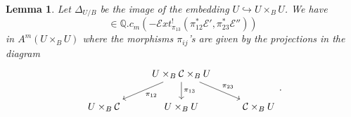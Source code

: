 \documentclass[11pt]{amsart}
\newtheorem{lemma}[theorem]{Lemma}
\theoremstyle{definition}
\newcommand{\Q}{\mathbb{Q}}
\newcommand{\hr}{\hookrightarrow}
\begin{document}
\begin{lemma}\label{lem2.1}
    Let $\Delta_{U/B}$ be the image of the embedding $U\hr U\times_B U$. We have \begin{equation*}[\Delta_{U/B}] \in \Q. c_{m} \left (-\mathscr Ext^!_{\pi_{13}} \left (\pi_{12}^* \mathcal E', \pi_{23}^*\mathcal E''  \right ) \right )\end{equation*} in $A^m \left (U\times_B U \right )$ where the morphisms $\pi_{ij}$'s are given by the projections in the diagram  $$\begin{tikzcd}&  U \times_B \mathcal C \times_B  U \arrow{d}{\pi_{13}}\arrow{rd}{\pi_{23}}\arrow{ld}{\pi_{12}} \\  U \times_B \mathcal C &  U\times_B  U & \mathcal C\times_B  U\end{tikzcd}. $$
\end{lemma}
\end{document}
